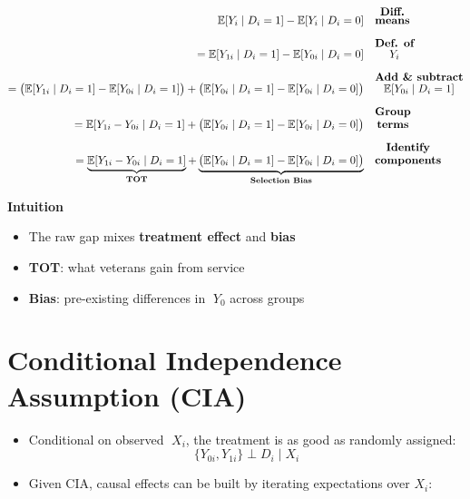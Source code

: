 \documentclass[12pt]{article}
\begin{document}
\singlespacing
\begin{align}
\mathbb{E}[Y_i \mid D_i=1] - \mathbb{E}[Y_i \mid D_i=0] 
   &\quad \text{\textbf{\shortstack{Diff. \\ means}}} \\[6pt]
= \mathbb{E}[Y_{1i} \mid D_i=1] - \mathbb{E}[Y_{0i} \mid D_i=0] 
   &\quad \text{\textbf{\shortstack{Def. of \\ $Y_i$}}} \\[6pt]
= \big(\mathbb{E}[Y_{1i} \mid D_i=1] - \mathbb{E}[Y_{0i} \mid D_i=1]\big) 
  + \big(\mathbb{E}[Y_{0i} \mid D_i=1] - \mathbb{E}[Y_{0i} \mid D_i=0]\big) 
   &\quad \text{\textbf{\shortstack{Add \& subtract \\ $\mathbb{E}[Y_{0i}\mid D_i=1]$}}} \\[6pt]
= \mathbb{E}[Y_{1i} - Y_{0i} \mid D_i=1] 
  + \big(\mathbb{E}[Y_{0i} \mid D_i=1] - \mathbb{E}[Y_{0i} \mid D_i=0]\big) 
   &\quad \text{\textbf{\shortstack{Group \\ terms}}} \\[6pt]
= \underbrace{\mathbb{E}[Y_{1i} - Y_{0i} \mid D_i=1]}_{\textbf{TOT}} 
  + \underbrace{\big(\mathbb{E}[Y_{0i} \mid D_i=1] - \mathbb{E}[Y_{0i} \mid D_i=0]\big)}_{\textbf{Selection Bias}} 
   &\quad \text{\textbf{\shortstack{Identify \\ components}}}
\end{align}


\textbf{Intuition}
\begin{itemize}
    \item The raw gap mixes \textbf{treatment effect} and \textbf{bias}
    \item \textbf{TOT}: what veterans gain from service
    \item \textbf{Bias}: pre-existing differences in \(\;Y_0\) across groups
\end{itemize}

\section*{\noindent\textbf{Conditional Independence Assumption (CIA)}}

\begin{itemize}
    \item Conditional on observed \(\;X_i\), the treatment is as good as randomly assigned:  
    \[
    \{Y_{0i}, Y_{1i}\} \perp D_i \mid X_i
    \]
    \item Given CIA, causal effects can be built by iterating expectations over \(X_i\):
\end{itemize}
\end{document}
